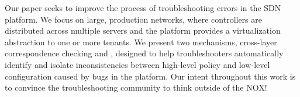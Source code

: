 Our paper seeks to improve the process of troubleshooting errors in the SDN
platform. We focus on large, production networks, 
where controllers are distributed across multiple servers
and the platform provides a virtualization abstraction to one or more tenants.
We present two mechanisms, cross-layer correspondence checking
and \simulator{}, designed to help troubleshooters automatically identify
and isolate inconsistencies between high-level policy and low-level configuration 
caused by bugs in the platform. Our intent throughout this work is to convince
the troubleshooting community to think outside of the NOX!
